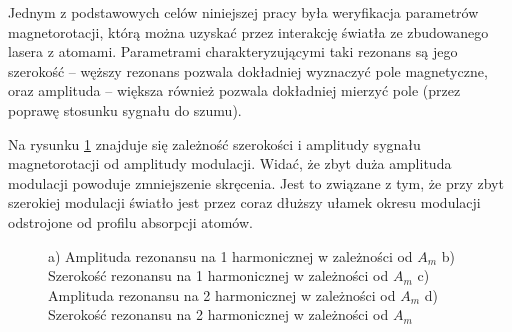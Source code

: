 \documentclass[a4paper,10pt]{article}
\begin{document}
Jednym z podstawowych celów niniejszej pracy była weryfikacja parametrów magnetorotacji, którą można uzyskać przez interakcję światła ze zbudowanego lasera z atomami.
Parametrami charakteryzującymi taki rezonans są jego  szerokość -- węższy rezonans pozwala dokładniej wyznaczyć pole magnetyczne, oraz amplituda -- większa również pozwala dokładniej mierzyć pole (przez poprawę stosunku sygnału do szumu).

Na rysunku \ref{wykresikioda} znajduje się zależność szerokości i amplitudy sygnału magnetorotacji od amplitudy modulacji. Widać, że zbyt duża amplituda modulacji powoduje zmniejszenie skręcenia. Jest to związane z tym, że przy zbyt szerokiej modulacji światło jest przez coraz dłuższy ułamek okresu modulacji odstrojone od profilu absorpcji atomów. 

\begin{figure}[h!]
\centering
{}


\caption{ a) Amplituda rezonansu na 1 harmonicznej w zależności od $A_m$ b) Szerokość rezonansu na 1 harmonicznej w zależności od $A_m$ 
c) Amplituda rezonansu na 2 harmonicznej w zależności od $A_m$ d) Szerokość rezonansu na 2 harmonicznej w zależności od $A_m$}
\label{wykresikioda}
\end{figure}
\end{document}
